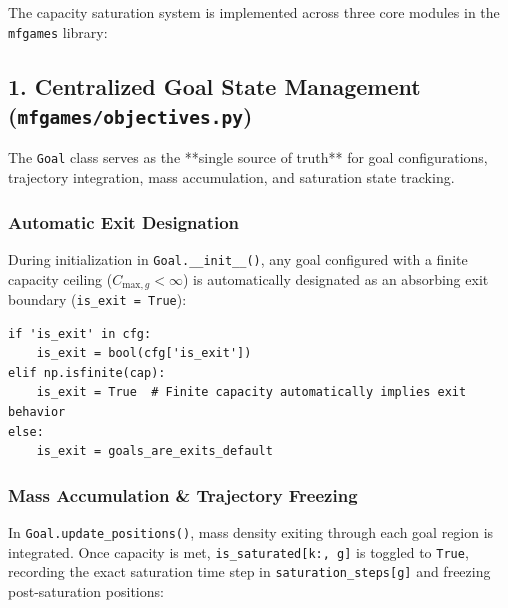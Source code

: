 \documentclass[11pt,a4paper]{article}
\begin{document}
The capacity saturation system is implemented across three core modules in the \texttt{mfgames} library:

\subsection{1. Centralized Goal State Management (\texttt{mfgames/objectives.py})}
The \texttt{Goal} class serves as the **single source of truth** for goal configurations, trajectory integration, mass accumulation, and saturation state tracking.

\subsubsection{Automatic Exit Designation}
During initialization in \texttt{Goal.__init__()}, any goal configured with a finite capacity ceiling ($C_{\text{max}, g} < \infty$) is automatically designated as an absorbing exit boundary (\texttt{is_exit = True}):

\begin{verbatim}
if 'is_exit' in cfg:
    is_exit = bool(cfg['is_exit'])
elif np.isfinite(cap):
    is_exit = True  # Finite capacity automatically implies exit behavior
else:
    is_exit = goals_are_exits_default
\end{verbatim}

\subsubsection{Mass Accumulation \& Trajectory Freezing}
In \texttt{Goal.update_positions()}, mass density exiting through each goal region is integrated. Once capacity is met, \texttt{is_saturated[k:, g]} is toggled to \texttt{True}, recording the exact saturation time step in \texttt{saturation_steps[g]} and freezing post-saturation positions:
\end{document}
